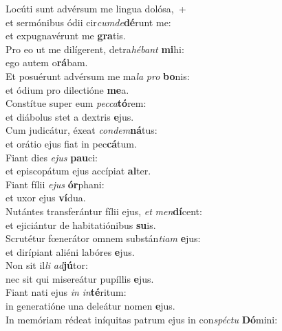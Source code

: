 \evenverse Locúti sunt advérsum me lingua dolósa,~+\\\evenverse  et sermónibus ódii cir\textit{cum}\textit{de}\textbf{dé}runt me:~\*\\
\evenverse et expugnavérunt me \textbf{gra}tis.\\
\oddverse Pro eo ut me dilígerent, detra\textit{hé}\textit{bant} \textbf{mi}hi:~\*\\
\oddverse ego autem o\textbf{rá}bam.\\
\evenverse Et posuérunt advérsum me ma\textit{la} \textit{pro} \textbf{bo}nis:~\*\\
\evenverse et ódium pro dilectióne \textbf{me}a.\\
\oddverse Constítue super eum \textit{pec}\textit{ca}\textbf{tó}rem:~\*\\
\oddverse et diábolus stet a dextris \textbf{e}jus.\\
\evenverse Cum judicátur, éxeat \textit{con}\textit{dem}\textbf{ná}tus:~\*\\
\evenverse et orátio ejus fiat in pec\textbf{cá}tum.\\
\oddverse Fiant dies \textit{e}\textit{jus} \textbf{pau}ci:~\*\\
\oddverse et episcopátum ejus accípiat \textbf{al}ter.\\
\evenverse Fiant fílii \textit{e}\textit{jus} \textbf{ór}phani:~\*\\
\evenverse et uxor ejus \textbf{ví}dua.\\
\oddverse Nutántes transferántur fílii ejus, \textit{et} \textit{men}\textbf{dí}cent:~\*\\
\oddverse et ejiciántur de habitatiónibus \textbf{su}is.\\
\evenverse Scrutétur fœnerátor omnem substán\textit{ti}\textit{am} \textbf{e}jus:~\*\\
\evenverse et dirípiant aliéni labóres \textbf{e}jus.\\
\oddverse Non sit il\textit{li} \textit{ad}\textbf{jú}tor:~\*\\
\oddverse nec sit qui misereátur pupíllis \textbf{e}jus.\\
\evenverse Fiant nati ejus \textit{in} \textit{in}\textbf{té}ritum:~\*\\
\evenverse in generatióne una deleátur nomen \textbf{e}jus.\\
\oddverse In memóriam rédeat iníquitas patrum ejus in con\textit{spé}\textit{ctu} \textbf{Dó}mini:~\*\\
